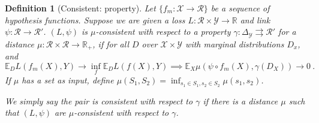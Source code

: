 \documentclass{article}
\newcommand{\Comments}{1}
\newcommand{\mynote}[2]{\ifnum\Comments=1\textcolor{#1}{#2}\fi}
\newcommand{\raf}[1]{\mynote{green}{[RF: #1]}}
\newcommand{\reals}{\mathbb{R}}
\newcommand{\simplex}{\Delta_\Y}
\newcommand{\E}{\mathbb{E}}
\newcommand{\R}{\mathcal{R}}
\newcommand{\X}{\mathcal{X}}
\newcommand{\Y}{\mathcal{Y}}
\newcommand{\toto}{\rightrightarrows}
\newtheorem{definition}{Definition}
\begin{document}
\begin{definition}[Consistent: property]
	Let $\{f_m: \X \to \R\}$ be a sequence of hypothesis functions.
	Suppose we are given a loss $L : \R \times \Y \to \reals$ and link $\psi : \R \to \R'$.
	$(L, \psi)$ is \emph{$\mu$-consistent with respect to a property} $\gamma: \simplex \toto \R'$ for a distance $\mu:\R \times \R \to \reals_+$, if for all $D$ over $\X \times \Y$ with marginal distributions $D_x$, and 
	\begin{equation}
	\E_{D} L(f_m(X), Y) \to \inf_f \E_{D} L( f(X), Y) \implies \E_X \mu(\psi \circ f_m(X), \gamma(D_X)) \to 0~.~
	\end{equation}
	If $\mu$ has a set as input, define $\mu(S_1, S_2) = \inf_{s_1 \in S_1, s_2 \in S_2} \mu(s_1, s_2)$.
	
	We simply say the pair is consistent with respect to $\gamma$ if there is a distance $\mu$ such that $(L,\psi)$ are $\mu$-consistent with respect to $\gamma$.
\end{definition}


\end{document}
